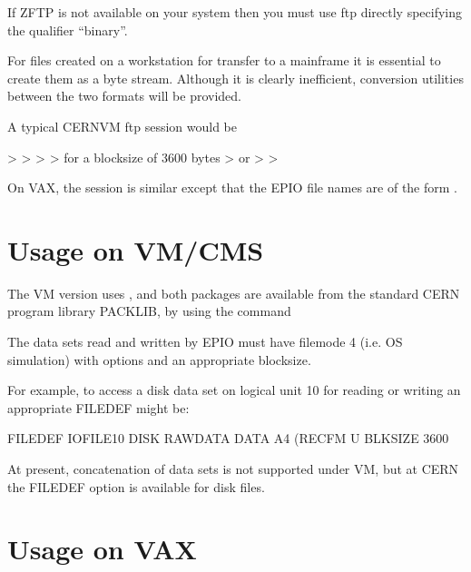 \begin{XMP}
\end{XMP}
 
If ZFTP is not available on your system then you must use ftp
directly specifying the qualifier ``binary''.

For files created on a workstation for transfer to a mainframe
it is essential to create them as a byte stream.
Although it is clearly inefficient, conversion utilities between
the two formats will be provided.
 
A typical CERNVM ftp session would be
\begin{XMP}
 > 
 > 
 > 
 >                for a blocksize of 3600 bytes
 >           or > 
 > 
\end{XMP} 
 
On VAX, the session is similar except that the EPIO file names
are of the form .

\section{Usage on VM/CMS}
 
The VM version uses , and both packages are available
from the standard CERN program library PACKLIB, by using the command

\begin{XMP}
\end{XMP}
 
The  data sets read and written by EPIO must have filemode 4
(i.e. OS simulation) with options  and an appropriate blocksize.
 
For example, to access a disk data set  on logical
unit 10 for reading or writing an appropriate FILEDEF might be:
\begin{XMP} 
 FILEDEF IOFILE10 DISK RAWDATA DATA A4 (RECFM U BLKSIZE 3600
\end{XMP} 
At present, concatenation of data sets is not supported under VM,
but at CERN the FILEDEF option  is available for disk files.

\section{Usage on VAX}

